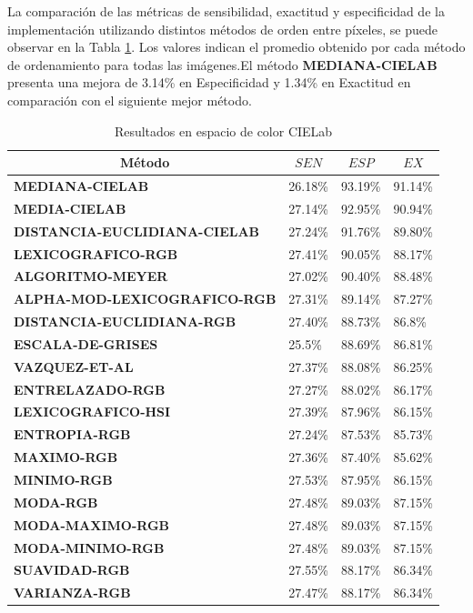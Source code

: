 La comparación de las métricas de sensibilidad, exactitud y especificidad de la implementación utilizando distintos métodos de orden entre píxeles, se puede observar en la Tabla \ref{resultadosCielab}. Los valores indican el promedio obtenido por cada método de ordenamiento para todas las imágenes.El método \textbf{MEDIANA-CIELAB} presenta una mejora de 3.14\% en Especificidad y 1.34\% en Exactitud en comparación con el siguiente mejor método. 


\begin{table}[]
\centering
\caption{Resultados en espacio de color CIELab}
\label{resultadosCielab}
\resizebox{15cm}{!} {
\begin{tabular}{|l|l|l|l|}
\hline
\multicolumn{1}{|c|}{\textbf{Método}} & \multicolumn{1}{c|}{\textbf{$SEN$}}& \multicolumn{1}{c|}{\textbf{$ESP$}}&  \multicolumn{1}{c|}{\textbf{$EX$}}  \\ \hline
\textbf{MEDIANA-CIELAB} & 26.18\%  & 93.19\%  & 91.14\%  \\ \hline
\textbf{MEDIA-CIELAB} & 27.14\%  & 92.95\% & 90.94\%  \\ \hline
\textbf{DISTANCIA-EUCLIDIANA-CIELAB} & 27.24\%  & 91.76\% & 89.80\% \\ \hline
\textbf{LEXICOGRAFICO-RGB} & 27.41\%  & 90.05\% & 88.17\% \\ \hline
\textbf{ALGORITMO-MEYER} & 27.02\%  & 90.40\%  & 88.48\% \\ \hline
\textbf{ALPHA-MOD-LEXICOGRAFICO-RGB} & 27.31\% & 89.14\% & 87.27\% \\ \hline
\textbf{DISTANCIA-EUCLIDIANA-RGB} & 27.40\% & 88.73\% & 86.8\%  \\ \hline
\textbf{ESCALA-DE-GRISES} & 25.5\%  & 88.69\%  & 86.81\%  \\ \hline
\textbf{VAZQUEZ-ET-AL} & 27.37\%  & 88.08\%  & 86.25\% \\ \hline
\textbf{ENTRELAZADO-RGB} & 27.27\% & 88.02\% & 86.17\% \\ \hline
\textbf{LEXICOGRAFICO-HSI} & 27.39\%  & 87.96\% & 86.15\%  \\ \hline
\textbf{ENTROPIA-RGB} & 27.24\%  & 87.53\%  & 85.73\% \\ \hline
\textbf{MAXIMO-RGB} & 27.36\%  & 87.40\%  & 85.62\%  \\ \hline
\textbf{MINIMO-RGB} & 27.53\%  & 87.95\%  & 86.15\%  \\ \hline
\textbf{MODA-RGB} & 27.48\%  & 89.03\%  & 87.15\% \\ \hline
\textbf{MODA-MAXIMO-RGB} & 27.48\%  & 89.03\% & 87.15\%   \\ \hline
\textbf{MODA-MINIMO-RGB} & 27.48\%  & 89.03\% &  87.15\%   \\ \hline
\textbf{SUAVIDAD-RGB} & 27.55\% & 88.17\%  & 86.34\% \\ \hline
\textbf{VARIANZA-RGB} & 27.47\%  & 88.17\%  & 86.34\% \\ \hline
\end{tabular}
}
\end{table}

